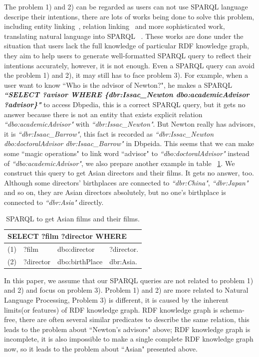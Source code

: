 \documentclass[runningheads]{llncs}
\begin{document}
The problem 1) and 2) can be regarded as users can not use SPARQL language descripe their intentions, there are lots of works being done to solve this problem, including entity linking~\cite{el_Han}, relation linking~\cite{dubey2018earl} and more sophisticated work, translating natural language into SPARQL ~\cite{sander2014ontology}.
These works are done under the situation that users lack the full knowledge of particular RDF knowledge graph, they aim to help users to generate well-formatted SPARQL query to reflect their intentions accurately, however, it is not enough. Even a SPARQL query can avoid the problem 1) and 2), it may still has to face problem 3).
For example, when a user want to know ``Who is the advisor of Newton?", he makes a SPARQL \textbf{\textit{``SELECT ?avisor WHERE \{dbr:Issac\_Newton dbo:academicAdvisor ?advisor\}"}} to access Dbpedia, this is a correct SPARQL query, but it gets no answer because there is not an entity that exists explicit relation \textit{``dbo:academicAdvisor"} with \textit{``dbr:Issac\_Newton"}. But Newton really has advisors, it is \textit{``dbr:Isaac\_Barrow"}, this fact is recorded as \textit{``dbr:Issac\_Newton dbo:doctoralAdvisor dbr:Isaac\_Barrow" } in Dbpeida.  This seems that we can make some ``magic operations" to link word ``advisor" to \textit{``dbo:doctoralAdvisor"} instead of \textit{``dbo:academicAdvisor"}, we also prepare another example in table ~\ref{film_table}. We construct this query to get Asian directors and their films. It gets no answer, too. Although some directors' birthplaces are connected to \textit{``dbr:China"}, \textit{``dbr:Japan"} and so on, they are Asian directors absolutely, but no one's birthplace is connected to \textit{``dbr:Asia"} directly.

\begin{table}
\caption{SPARQL to get Asian films and their films.}\label{film_table}
\centering
\begin{tabular}{|c|lll|}
\hline
\multicolumn{4}{|l|}{SELECT ?film ?director WHERE }\\
\hline
(1) &  ?film & dbo:director & ?director.\\
(2) &  ?director & dbo:birthPlace & dbr:Asia.\\
\hline
\end{tabular}
\end{table}

In this paper, we assume that our SPARQL queries are not related to problem 1) and 2) and focus on problem 3).
Problem 1) and 2) are more related to Natural Language Processing, Problem 3) is different, it is caused by the inherent limits(or features) of RDF knowledge graph. RDF knowledge graph is schema-free, there are often several similar predicates to describe the same relation, this leads to the problem about ``Newton's advisors" above; RDF knowledge graph is incomplete, it is also impossible to make a single complete RDF knowledge graph now, so it leads to the problem about ``Asian" presented above.
\end{document}
